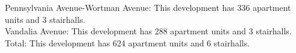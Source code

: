 {Pennsylvania Avenue-Wortman Avenue}: This development has 336 apartment units and 3 stairhalls.\\{Vandalia Avenue}: This development has 288 apartment units and 3 stairhalls.\\{Total}: This development has 624 apartment units and 6 stairhalls.\\